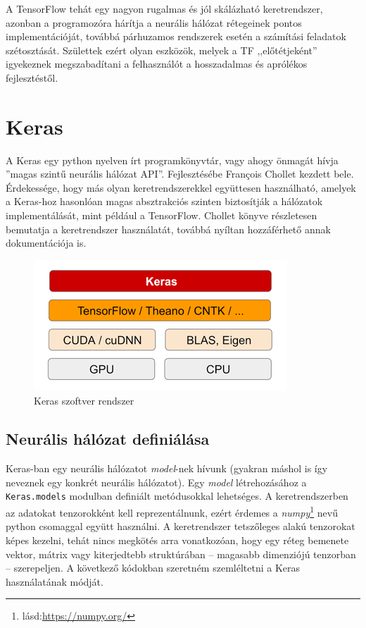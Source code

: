A TensorFlow tehát egy nagyon rugalmas és jól skálázható keretrendszer, azonban a programozóra hárítja a neurális hálózat rétegeinek pontos implementációját, továbbá párhuzamos rendszerek esetén a számítási feladatok szétosztását. Születtek ezért olyan eszközök, melyek a TF ,,előtétjeként'' igyekeznek megszabadítani a felhasználót a hosszadalmas és aprólékos fejlesztéstől.

\section{Keras}
A Keras egy python nyelven írt programkönyvtár, vagy ahogy önmagát hívja ''magas szintű neurális hálózat API''\cite{web:Keras}. Fejlesztésébe François Chollet kezdett bele. Érdekessége, hogy más olyan keretrendszerekkel együttesen használható, amelyek a Keras-hoz hasonlóan magas absztrakciós szinten biztosítják a hálózatok implementálását, mint például a TensorFlow.
Chollet könyve részletesen bemutatja a keretrendszer használatát, továbbá nyíltan hozzáférhető annak dokumentációja is.\cite{chollet}\cite{web:Keras}
\begin{figure}[h]
	\centering
	\includegraphics[width=0.5\linewidth]{fig/keras_software_stack}
	\caption{Keras szoftver rendszer\protect\footnotemark}
	\label{fig:kerassoftwarestack}
\end{figure}

\subsection{Neurális hálózat definiálása}
Keras-ban egy neurális hálózatot \emph{model}-nek hívunk (gyakran máshol is így neveznek egy konkrét neurális hálózatot). Egy \emph{model} létrehozásához a \verb|Keras.models| modulban definiált metódusokkal lehetséges. A keretrendszerben az adatokat tenzorokként kell reprezentálnunk, ezért érdemes a \emph{numpy}\footnote{lásd:\url{https://numpy.org/}} nevű python csomaggal együtt használni. A keretrendszer tetszőleges alakú tenzorokat képes kezelni, tehát nincs megkötés arra vonatkozóan, hogy egy réteg bemenete vektor, mátrix vagy kiterjedtebb struktúrában -- magasabb dimenziójú tenzorban -- szerepeljen. A következő kódokban szeretném szemléltetni a Keras használatának módját.

